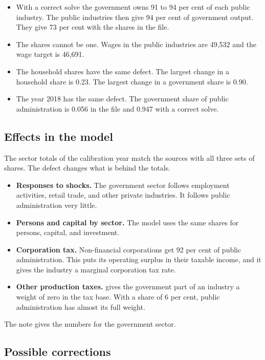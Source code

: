 \documentclass[11pt,a4paper]{article}
\newcommand{\code}[1]{\texttt{\detokenize{#1}}}
\begin{document}
\begin{itemize}
\item With a correct solve the government owns 91 to 94 per cent of each public industry. The public industries then give 94 per cent of government output. They give 73 per cent with the shares in the file.
\item The shares cannot be one. Wages in the public industries are 49,532 and the wage target is 46,691.
\item The household shares have the same defect. The largest change in a household share is 0.23. The largest change in a government share is 0.90.
\item The year 2018 has the same defect. The government share of public administration is 0.056 in the file and 0.947 with a correct solve.
\end{itemize}

\subsection{Effects in the model}

The sector totals of the calibration year match the sources with all three sets of shares. The defect changes what is behind the totals.
\begin{itemize}
\item \textbf{Responses to shocks.} The government sector follows employment activities, retail trade, and other private industries. It follows public administration very little.
\item \textbf{Persons and capital by sector.} The model uses the same shares for persons, capital, and investment.
\item \textbf{Corporation tax.} Non-financial corporations get 92 per cent of public administration. This puts its operating surplus in their taxable income, and it gives the industry a marginal corporation tax rate.
\item \textbf{Other production taxes.} \code{TaxesData.jl} gives the government part of an industry a weight of zero in the tax base. With a share of 6 per cent, public administration has almost its full weight.
\end{itemize}
The note \code{public_sector.tex} gives the numbers for the government sector.

\subsection{Possible corrections}
\end{document}
